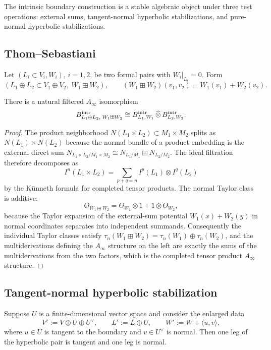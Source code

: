 The intrinsic boundary construction is a stable algebraic object under three test operations: external sums, tangent-normal hyperbolic stabilizations, and pure-normal hyperbolic stabilizations.

\subsection{Thom--Sebastiani}

Let $(L_i\subset V_i,W_i)$, $i=1,2$, be two formal pairs with $W_i|_{L_i}=0$. Form
\[
(L_1\oplus L_2 \subset V_1\oplus V_2,\; W_1\boxplus W_2),
\qquad
(W_1\boxplus W_2)(v_1,v_2)=W_1(v_1)+W_2(v_2).
\]

\begin{theorem}\label{thm:TS}
There is a natural filtered $A_\infty$ isomorphism
\[
B^{\mathrm{intr}}_{L_1\oplus L_2,\;W_1\boxplus W_2}
\cong
B^{\mathrm{intr}}_{L_1,W_1}\,\widehat{\otimes}\, B^{\mathrm{intr}}_{L_2,W_2}.
\]
\end{theorem}

\begin{proof}
The product neighborhood $N(L_1\times L_2)\subset M_1\times M_2$ splits as $N(L_1)\times N(L_2)$ because the normal bundle of a product embedding is the external direct sum $N_{L_1\times L_2/M_1\times M_2}\cong N_{L_1/M_1}\boxplus N_{L_2/M_2}$. The ideal filtration therefore decomposes as
\[
I^n(L_1\times L_2)=\sum_{p+q=n} I^p(L_1)\otimes I^q(L_2)
\]
by the K\"unneth formula for completed tensor products. The normal Taylor class is additive:
\[
\Theta_{W_1\boxplus W_2}=\Theta_{W_1}\otimes 1+1\otimes \Theta_{W_2},
\]
because the Taylor expansion of the external-sum potential $W_1(x)+W_2(y)$ in normal coordinates separates into independent summands. Consequently the individual Taylor classes satisfy $\tau_n(W_1\boxplus W_2)=\tau_n(W_1)\oplus \tau_n(W_2)$, and the multiderivations defining the $A_\infty$ structure on the left are exactly the sums of the multiderivations from the two factors, which is the completed tensor product $A_\infty$ structure.
\end{proof}

\subsection{Tangent-normal hyperbolic stabilization}

Suppose $U$ is a finite-dimensional vector space and consider the enlarged data
\[
V':=V\oplus U\oplus U^\vee,
\qquad
L':=L\oplus U,
\qquad
W':=W+\langle u,v\rangle,
\]
where $u\in U$ is tangent to the boundary and $v\in U^\vee$ is normal. Then one leg of the hyperbolic pair is tangent and one leg is normal.

